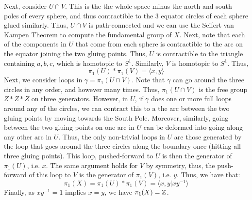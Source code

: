 \documentclass[12pt]{article}
\begin{document}
\begin{solu}
\begin{enumerate}
        Next, consider $U \cap V$. This is the the whole space minus the north and south poles of every sphere, and thus contractible to the $3$ equator circles of each sphere glued similarly. Thus, $U \cap V$ is path-connected and we can use the Seifert van Kampen Theorem to compute the fundamental group of $X$. \bbni
        Next, note that each of the components in $U$ that come from each sphere is contractible to the arc on the equator joining the two gluing points. Thus, $U$ is contractible to the triangle containing $a, b, c$, which is homotopic to $S^1$. Similarly, $V$ is homotopic to $S^1$. Thus, 
        \[ \pi_1(U) * \pi_1(V) = \langle x, y \rangle \]
        Next, we consider loops in $\gamma = \pi_1(U \cap V)$. Note that $\gamma$ can go around the three circles in any order, and however many times. Thus, $\pi_1(U \cap V)$ is the free group $Z * Z * Z$ on three generators. However, in $U$, if $\gamma$ does one or more full loops around any of the circles, we can contract this to a the arc between the two gluing points by moving towards the South Pole. Moreover, similarly, going between the two gluing points on one arc in $U$ can be deformed into going along any other arc in $U$. Thus, the only non-trivial loops in $U$ are those generated by the loop that goes around the three circles along the boundary once (hitting all three gluing points). This loop, pushed-forward to $U$ is then the generator of $\pi_1(U)$, i.e. $x$. The same argument holds for $V$ by symmetry, thus, the push-forward of this loop to $V$ is the generator of $\pi_1(V)$, i.e. $y$. Thus, we have that:
        \[ \pi_1(X) = \pi_1(U) * \pi_1(V) = \langle x, y | xy^{-1} \rangle\]
        Finally, as $xy^{-1} = 1$ implies $x = y$, we have $\pi_1(X) = \mathbb Z$.    
    \end{enumerate}
\end{solu}
\newpage
\end{document}
